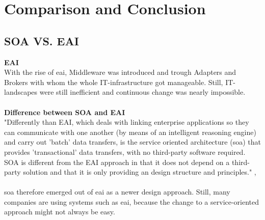 \documentclass[12pt]{article}
\begin{document}
\section{Comparison and Conclusion}
\subsection{SOA VS. EAI}
\textbf{EAI}\\
With the rise of \gls{eai}, Middleware was introduced and trough Adapters and Brokers with whom the whole IT-infrastructure got manageable. Still, IT-landscapes were still inefficient and continuous change was nearly impossible.\cite[page 115]{te}
\\
\\\textbf{Difference between SOA and EAI}\\
"Differently than EAI, which deals with linking enterprise applications so they can communicate with one another (by means of an intelligent reasoning engine) and carry out 'batch' data transfers, is the service oriented architecture (\gls{soa}) that provides 'transactional' data transfers, with no third-party software required. SOA is different from the EAI approach in that it does not depend on a third-party solution and that it is only providing an design structure and principles." ,\cite{soadef}\\
\\
\gls{soa} therefore emerged out of \gls{eai} as a newer design approach. Still, many companies are using systems such as \gls{eai}, because the change to a service-oriented approach might not always be easy. 
\end{document}
